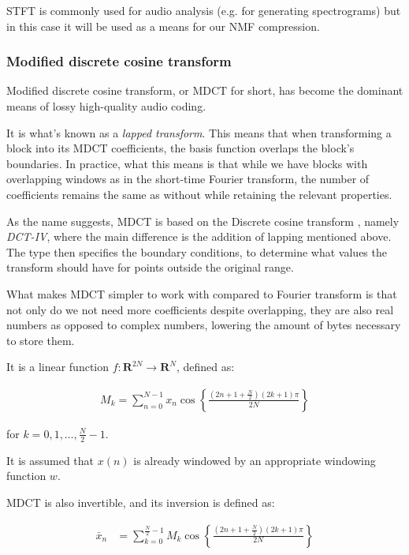 STFT is commonly used for audio analysis (e.g. for generating spectrograms) but in this case it will be used as a means for our NMF compression.

\subsubsection{Modified discrete cosine transform}
\label{sec:mdct}
Modified discrete cosine transform, or MDCT for short, has become the dominant means of lossy high-quality audio coding. \cite{wang_vilermo_2012_mdct}

It is what's known as a \emph{lapped transform}. This means that when transforming a block into its MDCT coefficients, the basis function overlaps the block's boundaries. \cite{Malvar:1992:SPL:531523} In practice, what this means is that while we have blocks with overlapping windows as in the short-time Fourier transform, the number of coefficients remains the same as without while retaining the relevant properties.

As the name suggests, MDCT is based on the Discrete cosine transform \cite{ahmed_1974}, namely \emph{DCT-IV}, where the main difference is the addition of lapping mentioned above. The type then specifies the boundary conditions, to determine what values the transform should have for points outside the original range.

What makes MDCT simpler to work with compared to Fourier transform is that not only do we not need more coefficients despite overlapping, they are also real numbers as opposed to complex numbers, lowering the amount of bytes necessary to store them.

It is a linear function $f: \mathbf{R}^{2N} \rightarrow \mathbf{R}^N$, defined as: \cite{Babu2013FastAE}

\begin{align}
\label{equ:mdct}
M_k = \sum_{n=0}^{N-1} x_n \cos \left\lbrace \frac{(2n+1+ \frac{N}{2} )(2k+1)\pi }{2N} \right\rbrace
\end{align}

for $k = 0, 1, \ldots, \frac{N}{2}-1$.

It is assumed that $x(n)$ is already windowed by an appropriate windowing function $w$.

MDCT is also invertible, and its inversion is defined as:

\begin{align}
\label{equ:imdct}
\bar{x}_n &= \sum_{k=0}^{\frac{N}{2}-1} M_k \cos \left\lbrace \frac{(2n+1+ \frac{N}{2} )(2k+1)\pi }{2N} \right\rbrace
\end{align}

